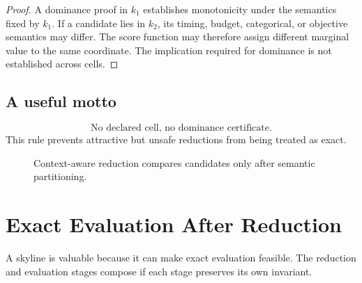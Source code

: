 \documentclass[11pt,oneside]{article}
\theoremstyle{definition}
\begin{document}
\begin{proof}
A dominance proof in \(k_1\) establishes monotonicity under the semantics fixed by \(k_1\). If a candidate lies in \(k_2\), its timing, budget, categorical, or objective semantics may differ. The score function may therefore assign different marginal value to the same coordinate. The implication required for dominance is not established across cells.
\end{proof}

\subsection{A useful motto}
\[
  \boxed{\text{No declared cell, no dominance certificate.}}
\]
This rule prevents attractive but unsafe reductions from being treated as exact.

\begin{figure}[H]
\centering
{}
\caption{Context-aware reduction compares candidates only after semantic partitioning.}
\end{figure}

\section{Exact Evaluation After Reduction}

A skyline is valuable because it can make exact evaluation feasible. The reduction and evaluation stages compose if each stage preserves its own invariant.
\end{document}
